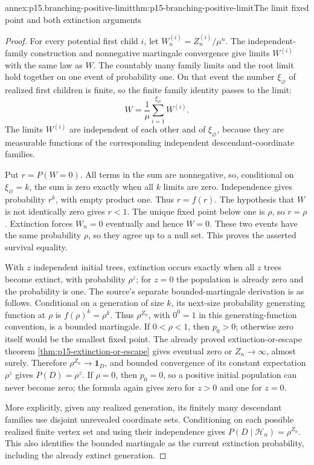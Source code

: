 \begin{annexitem}{annex:p15.branching-positive-limit}{thm:p15-branching-positive-limit}{The limit fixed point and both extinction arguments}
\begin{proof}
For every potential first child \(i\), let
\(W_n^{(i)}=Z_n^{(i)}/\mu^n\).
The independent-family construction and nonnegative martingale
convergence give limits \(W^{(i)}\) with the same law as \(W\).
The countably many family limits and the root limit hold together
on one event of probability one. On that event the number
\(\xi_\varnothing\) of realized first children is finite, so the
finite family identity passes to the limit:
\[
                            W=\frac1\mu
                                      \sum_{i=1}^{\xi_\varnothing}W^{(i)}.
\]
The limits \(W^{(i)}\) are independent of each other and of
\(\xi_\varnothing\), because they are measurable functions of
the corresponding independent descendant-coordinate families.

Put \(r=P(W=0)\).
All terms in the sum are nonnegative, so, conditional on
\(\xi_\varnothing=k\), the sum is zero exactly when all \(k\)
limits are zero. Independence gives probability \(r^k\),
with empty product one. Thus \(r=f(r)\).
The hypothesis that \(W\) is not identically zero gives \(r<1\).
The unique fixed point below one is \(\rho\), so \(r=\rho\).
Extinction forces \(W_n=0\) eventually and hence \(W=0\).
These two events have the same probability \(\rho\), so they
agree up to a null set. This proves the asserted survival equality.

With \(z\) independent initial trees, extinction occurs exactly when
all \(z\) trees become extinct, with probability \(\rho^z\);
for \(z=0\) the population is already zero and the probability is one.
The source's separate bounded-martingale derivation is as follows.
Conditional on a generation of size \(k\), its next-size
probability generating function at \(\rho\) is \(f(\rho)^k=\rho^k\).
Thus \(\rho^{Z_n}\), with \(0^0=1\) in this generating-function
convention, is a bounded martingale.
If \(0<\rho<1\), then \(p_0>0\); otherwise zero itself would
be the smallest fixed point.
The already proved extinction-or-escape theorem
\cref{thm:p15-extinction-or-escape} gives eventual zero or
\(Z_n\to\infty\), almost surely.
Therefore \(\rho^{Z_n}\to\mathbf1_D\), and bounded convergence
of its constant expectation \(\rho^z\) gives \(P(D)=\rho^z\).
If \(\rho=0\), then \(p_0=0\), so a positive initial population
can never become zero; the formula again gives zero for \(z>0\)
and one for \(z=0\).

More explicitly, given any realized generation, its finitely many
descendant families use disjoint unrevealed coordinate sets.
Conditioning on each possible realized finite vertex set and using
their independence gives
\(P(D\mid\mathcal H_n)=\rho^{Z_n}\).
This also identifies the bounded martingale as the current extinction
probability, including the already extinct generation.
\end{proof}
\end{annexitem}

